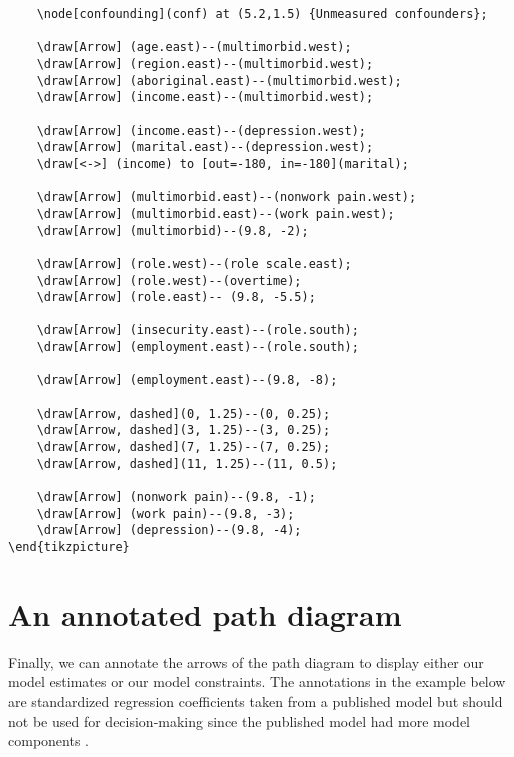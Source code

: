\documentclass[a4paper]{report}
\begin{document}
\begin{framed}
\begin{Verbatim}
    \node[confounding](conf) at (5.2,1.5) {Unmeasured confounders};
    
    \draw[Arrow] (age.east)--(multimorbid.west);
    \draw[Arrow] (region.east)--(multimorbid.west);
    \draw[Arrow] (aboriginal.east)--(multimorbid.west);
    \draw[Arrow] (income.east)--(multimorbid.west);
    
    \draw[Arrow] (income.east)--(depression.west);
    \draw[Arrow] (marital.east)--(depression.west);
    \draw[<->] (income) to [out=-180, in=-180](marital);
    
    \draw[Arrow] (multimorbid.east)--(nonwork pain.west);
    \draw[Arrow] (multimorbid.east)--(work pain.west);
    \draw[Arrow] (multimorbid)--(9.8, -2);
    
    \draw[Arrow] (role.west)--(role scale.east);
    \draw[Arrow] (role.west)--(overtime);
    \draw[Arrow] (role.east)-- (9.8, -5.5);
    
    \draw[Arrow] (insecurity.east)--(role.south);
    \draw[Arrow] (employment.east)--(role.south);
    
    \draw[Arrow] (employment.east)--(9.8, -8);

    \draw[Arrow, dashed](0, 1.25)--(0, 0.25);
    \draw[Arrow, dashed](3, 1.25)--(3, 0.25);
    \draw[Arrow, dashed](7, 1.25)--(7, 0.25);
    \draw[Arrow, dashed](11, 1.25)--(11, 0.5);
 
    \draw[Arrow] (nonwork pain)--(9.8, -1);
    \draw[Arrow] (work pain)--(9.8, -3);
    \draw[Arrow] (depression)--(9.8, -4);   
\end{tikzpicture}

\end{Verbatim}
\end{framed}


\section{An annotated path diagram}
Finally, we can annotate the arrows of the path diagram to display either our model estimates or our model constraints. The annotations in the example below are standardized regression coefficients taken from a published model but should not be used for decision-making since the published model had more model components \cite{franche2011examining}.
\end{document}
